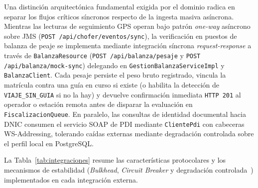 \documentclass[11pt,a4paper,twocolumn]{article}
\begin{document}
Una distinción arquitectónica fundamental exigida por el dominio radica en separar los flujos críticos síncronos respecto de la ingesta masiva asíncrona. Mientras las lecturas de seguimiento GPS operan bajo patrón \textit{one-way} asíncrono sobre JMS (\texttt{POST /api/chofer/eventos/sync}), la verificación en puestos de balanza de peaje se implementa mediante integración síncrona \textit{request-response} a través de \texttt{BalanzaResource} (\texttt{POST /api/balanza/pesaje} y \texttt{POST /api/balanza/mock-sync}) delegando en \texttt{GestionBalanzaServiceImpl} y \texttt{BalanzaClient}. Cada pesaje persiste el peso bruto registrado, vincula la matrícula contra una guía en curso si existe (o habilita la detección de \texttt{VIAJE\_SIN\_GUIA} si no la hay) y devuelve confirmación inmediata \texttt{HTTP~201} al operador o estación remota antes de disparar la evaluación en \texttt{FiscalizacionQueue}. En paralelo, las consultas de identidad documental hacia DNIC consumen el servicio SOAP de PDI mediante \texttt{ClientePdi} con cabeceras WS-Addressing, tolerando caídas externas mediante degradación controlada sobre el perfil local en PostgreSQL.

La Tabla~\ref{tab:integraciones} resume las características protocolares y los mecanismos de estabilidad (\textit{Bulkhead}, \textit{Circuit Breaker} y degradación controlada~\cite{nygard,fowler}) implementados en cada integración externa.
\end{document}
